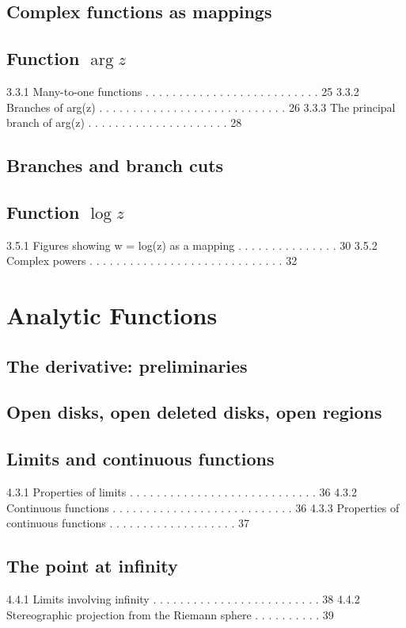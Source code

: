 \subsection{Complex functions as mappings}
\subsection{Function $\arg z$}
3.3.1 Many-to-one functions . . . . . . . . . . . . . . . . . . . . . . . . . . 25
3.3.2 Branches of arg(z) . . . . . . . . . . . . . . . . . . . . . . . . . . . . 26
3.3.3 The principal branch of arg(z) . . . . . . . . . . . . . . . . . . . . . 28
\subsection{Branches and branch cuts}
\subsection{Function $\log z$}
3.5.1 Figures showing w = log(z) as a mapping . . . . . . . . . . . . . . . 30
3.5.2 Complex powers . . . . . . . . . . . . . . . . . . . . . . . . . . . . . 32

\section{Analytic Functions}
\subsection{The derivative: preliminaries}
\subsection{Open disks, open deleted disks, open regions}
\subsection{Limits and continuous functions}
4.3.1 Properties of limits . . . . . . . . . . . . . . . . . . . . . . . . . . . . 36
4.3.2 Continuous functions . . . . . . . . . . . . . . . . . . . . . . . . . . . 36
4.3.3 Properties of continuous functions . . . . . . . . . . . . . . . . . . . 37
\subsection{The point at infinity}
4.4.1 Limits involving infinity . . . . . . . . . . . . . . . . . . . . . . . . . 38
4.4.2 Stereographic projection from the Riemann sphere . . . . . . . . . . 39
